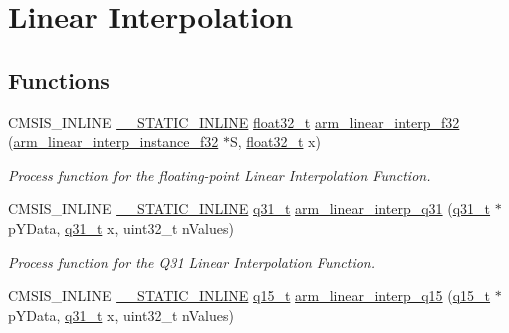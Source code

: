 \hypertarget{group___linear_interpolate}{}\section{Linear Interpolation}
\label{group___linear_interpolate}
\subsection*{Functions}
\begin{DoxyCompactItemize}
\item 
C\+M\+S\+I\+S\+\_\+\+I\+N\+L\+I\+NE \mbox{\hyperlink{cmsis__iccarm_8h_aba87361bfad2ae52cfe2f40c1a1dbf9c}{\+\_\+\+\_\+\+S\+T\+A\+T\+I\+C\+\_\+\+I\+N\+L\+I\+NE}} \mbox{\hyperlink{arm__math_8h_a4611b605e45ab401f02cab15c5e38715}{float32\+\_\+t}} \mbox{\hyperlink{group___linear_interpolate_ga790bbc697724ee432f840cfebbbae1f4}{arm\+\_\+linear\+\_\+interp\+\_\+f32}} (\mbox{\hyperlink{structarm__linear__interp__instance__f32}{arm\+\_\+linear\+\_\+interp\+\_\+instance\+\_\+f32}} $\ast$S, \mbox{\hyperlink{arm__math_8h_a4611b605e45ab401f02cab15c5e38715}{float32\+\_\+t}} x)
\begin{DoxyCompactList}\small\item\em Process function for the floating-\/point Linear Interpolation Function. \end{DoxyCompactList}\item 
C\+M\+S\+I\+S\+\_\+\+I\+N\+L\+I\+NE \mbox{\hyperlink{cmsis__iccarm_8h_aba87361bfad2ae52cfe2f40c1a1dbf9c}{\+\_\+\+\_\+\+S\+T\+A\+T\+I\+C\+\_\+\+I\+N\+L\+I\+NE}} \mbox{\hyperlink{arm__math_8h_adc89a3547f5324b7b3b95adec3806bc0}{q31\+\_\+t}} \mbox{\hyperlink{group___linear_interpolate_gaad59cea673ab358888075b040bacc71f}{arm\+\_\+linear\+\_\+interp\+\_\+q31}} (\mbox{\hyperlink{arm__math_8h_adc89a3547f5324b7b3b95adec3806bc0}{q31\+\_\+t}} $\ast$p\+Y\+Data, \mbox{\hyperlink{arm__math_8h_adc89a3547f5324b7b3b95adec3806bc0}{q31\+\_\+t}} x, uint32\+\_\+t n\+Values)
\begin{DoxyCompactList}\small\item\em Process function for the Q31 Linear Interpolation Function. \end{DoxyCompactList}\item 
C\+M\+S\+I\+S\+\_\+\+I\+N\+L\+I\+NE \mbox{\hyperlink{cmsis__iccarm_8h_aba87361bfad2ae52cfe2f40c1a1dbf9c}{\+\_\+\+\_\+\+S\+T\+A\+T\+I\+C\+\_\+\+I\+N\+L\+I\+NE}} \mbox{\hyperlink{arm__math_8h_ab5a8fb21a5b3b983d5f54f31614052ea}{q15\+\_\+t}} \mbox{\hyperlink{group___linear_interpolate_ga7e5d633c26edd82e009517cd2347fb00}{arm\+\_\+linear\+\_\+interp\+\_\+q15}} (\mbox{\hyperlink{arm__math_8h_ab5a8fb21a5b3b983d5f54f31614052ea}{q15\+\_\+t}} $\ast$p\+Y\+Data, \mbox{\hyperlink{arm__math_8h_adc89a3547f5324b7b3b95adec3806bc0}{q31\+\_\+t}} x, uint32\+\_\+t n\+Values)

\end{DoxyCompactItemize}

